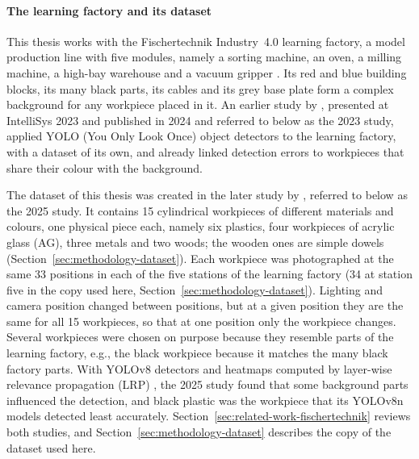 \paragraph{The learning factory and its dataset}
This thesis works with the Fischertechnik Industry~4.0 learning factory, a model
production line with five modules, namely a sorting machine, an oven, a milling machine,
a high-bay warehouse and a vacuum gripper \citep{schneidereitFischertechnik2023,
schneidereitYOLOv8}. Its red and blue building blocks, its many black parts, its cables
and its grey base plate form a complex background for any workpiece placed in it. An
earlier study by \citet{schneidereitFischertechnik2023},
presented at IntelliSys 2023 and published in 2024 and referred to below as the 2023
study, applied
YOLO (You Only Look Once) object detectors \citep{redmon2016yolo} to the learning factory,
with a dataset of its own, and already linked detection errors to workpieces that share
their colour with the background.

The dataset of this thesis was created in the later study by \citet*{schneidereitYOLOv8}, referred to below as the 2025 study. It
contains 15 cylindrical workpieces of different materials and colours, one physical piece
each, namely six plastics, four workpieces of acrylic glass (AG), three metals and two
woods; the wooden ones are simple dowels (Section~\ref{sec:methodology-dataset}). Each
workpiece was photographed at the same 33 positions in each of the five stations of the
learning factory (34 at station five in the copy used here,
Section~\ref{sec:methodology-dataset}). Lighting and camera position changed between positions, but at a given
position they are the same for all 15 workpieces, so that at one position only the
workpiece changes. Several workpieces were chosen on purpose because they resemble
parts of the learning factory, e.g., the black workpiece because it matches the many
black factory parts. With YOLOv8 detectors and heatmaps computed by
layer-wise relevance propagation (LRP) \citep{bach2015lrp, montavon2019lrp}, the 2025
study found that some background parts influenced the detection, and black plastic was the
workpiece that its YOLOv8n models detected least accurately. Section~\ref{sec:related-work-fischertechnik} reviews both
studies, and Section~\ref{sec:methodology-dataset} describes the copy of the dataset used
here.

